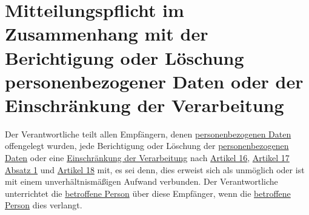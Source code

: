 \chapter{Mitteilungspflicht im Zusammenhang mit der Berichtigung oder Löschung personenbezogener Daten oder der
 Einschränkung der Verarbeitung}
\label{ch:19}


Der Verantwortliche teilt allen Empfängern, denen \hyperref[itm:04-1]{personenbezogenen Daten} offengelegt wurden, jede Berichtigung oder
Löschung der \hyperref[itm:04-1]{personenbezogenen Daten} oder eine \hyperref[itm:04-3]{Einschränkung der Verarbeitung} nach \hyperref[ch:16]{Artikel 16},
\hyperref[itm:17-1]{Artikel 17 Absatz 1} und \hyperref[ch:18]{Artikel 18} mit, es sei denn, dies erweist sich als
unmöglich oder ist mit einem unverhältnismäßigen Aufwand verbunden. Der Verantwortliche unterrichtet die \hyperref[itm:04-1]{betroffene
Person} über diese Empfänger, wenn die \hyperref[itm:04-1]{betroffene Person} dies verlangt.



